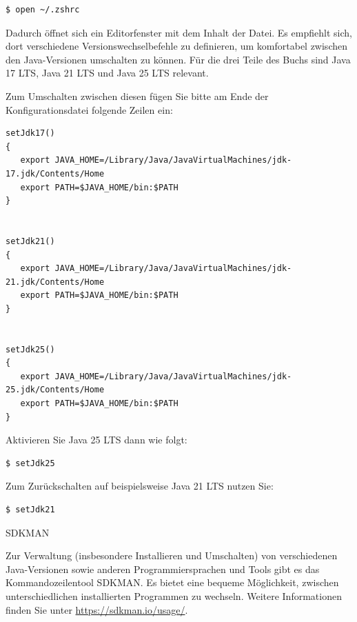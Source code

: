  \vspace{-0.75mm}
\begin{lstlisting}
$ open ~/.zshrc
\end{lstlisting}
\vspace{-0.75mm}
\lstset{mathescape=false}


Dadurch öffnet sich ein Editorfenster mit dem Inhalt der Datei. Es empfiehlt sich, dort
verschiedene Versionswechselbefehle zu definieren, um komfortabel zwischen den
Java-Versionen umschalten zu können. Für die drei Teile des Buchs sind
Java  17 LTS, Java 21 LTS und Java 25 LTS relevant.


\vfill
\pagebreak
Zum Umschalten zwischen diesen fügen Sie bitte  am Ende der Konfigurationsdatei folgende Zeilen ein:


\vspace{-0.5mm}
\begin{lstlisting}
setJdk17()
{
   export JAVA_HOME=/Library/Java/JavaVirtualMachines/jdk-17.jdk/Contents/Home
   export PATH=$JAVA_HOME/bin:$PATH
}


setJdk21()
{
   export JAVA_HOME=/Library/Java/JavaVirtualMachines/jdk-21.jdk/Contents/Home
   export PATH=$JAVA_HOME/bin:$PATH
}


setJdk25()
{
   export JAVA_HOME=/Library/Java/JavaVirtualMachines/jdk-25.jdk/Contents/Home
   export PATH=$JAVA_HOME/bin:$PATH
}
\end{lstlisting}
\vspace{-0.5mm}
\lstset{mathescape=false}


Aktivieren Sie Java 25 LTS dann wie folgt:


 \vspace{-0.75mm}
\begin{lstlisting}
$ setJdk25
\end{lstlisting}
\vspace{-0.75mm}
\lstset{mathescape=false}


Zum Zurückschalten auf beispielsweise Java 21 LTS nutzen Sie:


 \vspace{-0.75mm}
\begin{lstlisting}
$ setJdk21
\end{lstlisting}
\vspace{-0.75mm}
\lstset{mathescape=false}




\begin{praxistipp}{SDKMAN}
\noindent
\begin{center}
\begin{minipage}{\textwidth-0.6cm}
Zur Verwaltung (insbesondere Installieren und Umschalten) von verschiedenen Java-Versionen
sowie anderen Programmiersprachen und Tools gibt es das Kommandozeilentool SDKMAN.
Es bietet eine bequeme Möglichkeit, zwischen unterschiedlichen installierten Programmen zu wechseln.
Weitere Informationen finden Sie unter \url{https://sdkman.io/usage/}.
\end{minipage}
\end{center}
\end{praxistipp}




